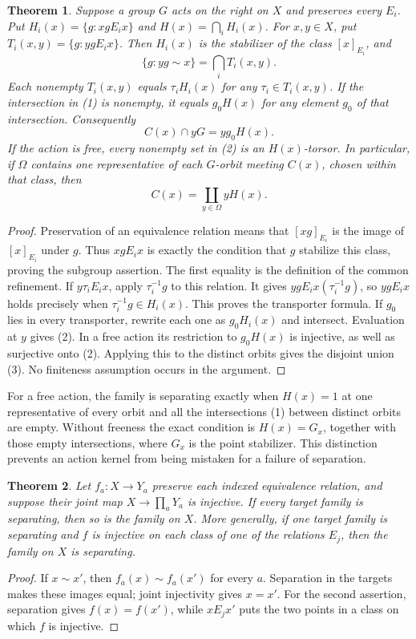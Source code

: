 \documentclass[a4paper,11pt]{article}
\newtheorem{theorem}{Theorem}\newtheorem{lemma}[theorem]{Lemma}
\begin{document}
\begin{theorem}\label{transport}
Suppose a group $G$ acts on the right on $X$ and preserves every $E_i$.
Put $H_i(x)=\{g:xgE_i x\}$ and $H(x)=\bigcap_i H_i(x)$.
For $x,y\in X$, put $T_i(x,y)=\{g:ygE_i x\}$.
Then $H_i(x)$ is the stabilizer of the class $[x]_{E_i}$, and
\[
 \{g:yg\sim x\}=\bigcap_i T_i(x,y).
 \tag{1}
\]
Each nonempty $T_i(x,y)$ equals $\tau_i H_i(x)$ for any
$\tau_i\in T_i(x,y)$. If the intersection in (1) is nonempty, it equals
$g_0H(x)$ for any element $g_0$ of that intersection. Consequently
\[
 C(x)\cap yG=yg_0H(x).
 \tag{2}
\]
If the action is free, every nonempty set in (2) is an $H(x)$-torsor.
In particular, if $\Omega$ contains one representative of each $G$-orbit
meeting $C(x)$, chosen within that class, then
\[
 C(x)=\coprod_{y\in\Omega}yH(x).
 \tag{3}
\]
\end{theorem}
\begin{proof}
Preservation of an equivalence relation means that $[xg]_{E_i}$ is the
image of $[x]_{E_i}$ under $g$. Thus $xgE_i x$ is exactly the condition
that $g$ stabilize this class, proving the subgroup assertion.
The first equality is the definition of the common refinement.
If $y\tau_iE_i x$, apply $\tau_i^{-1}g$ to this relation. It gives
$ygE_i x(\tau_i^{-1}g)$, so $ygE_i x$ holds precisely when
$\tau_i^{-1}g\in H_i(x)$. This proves the transporter formula.
If $g_0$ lies in every transporter, rewrite each one as $g_0H_i(x)$
and intersect. Evaluation at $y$ gives (2). In a free action its
restriction to $g_0H(x)$ is injective, as well as surjective onto (2).
Applying this to the distinct orbits gives the disjoint union (3).
No finiteness assumption occurs in the argument.
\end{proof}

For a free action, the family is separating exactly when $H(x)=1$
at one representative of every orbit and all the intersections (1)
between distinct orbits are empty. Without freeness the exact condition
is $H(x)=G_x$, together with those empty intersections, where $G_x$
is the point stabilizer. This distinction prevents an action kernel
from being mistaken for a failure of separation.

\begin{theorem}\label{joint}
Let $f_a:X\to Y_a$ preserve each indexed equivalence relation, and
suppose their joint map $X\to\prod_aY_a$ is injective. If every target
family is separating, then so is the family on $X$.
More generally, if one target family is separating and $f$ is injective
on each class of one of the relations $E_j$, then the family on $X$
is separating.
\end{theorem}
\begin{proof}
If $x\sim x'$, then $f_a(x)\sim f_a(x')$ for every $a$. Separation
in the targets makes these images equal; joint injectivity gives $x=x'$.
For the second assertion, separation gives $f(x)=f(x')$, while
$xE_jx'$ puts the two points in a class on which $f$ is injective.
\end{proof}
\end{document}
